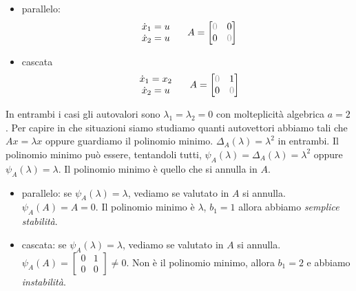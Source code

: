 \begin{itemize}
	\item parallelo:\begin{equation*}
	      \begin{array}{ c }
	      	\dot{x}_1 =u \\
	      	\dot{x}_2 =u 
	      \end{array} \ \ \ \ A=\begin{bmatrix}
	      \textcolor[rgb]{0.61,0.61,0.61}{0} & 0\\
	      0 & \textcolor[rgb]{0.61,0.61,0.61}{0}
	\end{bmatrix}
	\end{equation*}
	\item cascata\begin{equation*}
	      \begin{array}{ c }
	      	\dot{x}_1 =x_2 \\
	      	\dot{x}_2 =u   
	      \end{array} \ \ \ \ A=\begin{bmatrix}
	      \textcolor[rgb]{0.61,0.61,0.61}{0} & 1\\
	      0 & \textcolor[rgb]{0.61,0.61,0.61}{0}
	\end{bmatrix}
	\end{equation*}
\end{itemize}

In entrambi i casi gli autovalori sono $\lambda _1 =\lambda _2 =0$ con molteplicità algebrica $a=2$. Per capire in che situazioni siamo studiamo quanti autovettori abbiamo tali che $Ax=\lambda x$ oppure guardiamo il polinomio minimo. $\Delta _A\left(\lambda \right) =\lambda ^2$ in entrambi. Il polinomio minimo può essere, tentandoli tutti, $\psi _A\left(\lambda \right) =\Delta _A\left(\lambda \right) =\lambda ^2$ oppure $\psi _A\left(\lambda \right) =\lambda $. Il polinomio minimo è quello che si annulla in $A$.
\begin{itemize}
	\item parallelo: se $\psi _A\left(\lambda \right) =\lambda $, vediamo se valutato in $A$ si annulla. $\psi _A\left(A\right) =A=0$. Il polinomio minimo è $\lambda $, $b_1 =1$ allora abbiamo \textit{semplice stabilità}.
	\item cascata: se $\psi _A\left(\lambda \right) =\lambda $, vediamo se valutato in $A$ si annulla. $\psi _A\left(A\right) =\begin{bmatrix}
	      0 & 1\\
	      0 & 0
	\end{bmatrix} \neq 0$. Non è il polinomio minimo, allora $b_1 =2$ e abbiamo \textit{instabilità}.
\end{itemize}

